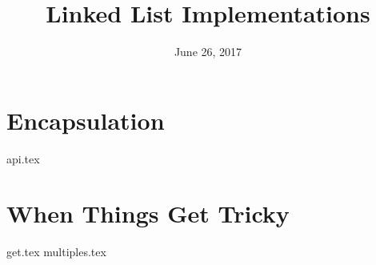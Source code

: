 \documentclass{exam}
\title{Linked List Implementations}
\date{June 26, 2017}
\begin{document}
\maketitle

\section{Encapsulation}
{api.tex}

\section{When Things Get Tricky}
\begin{questions}
{get.tex}
\clearpage
{multiples.tex}
\end{questions}
\end{document}
